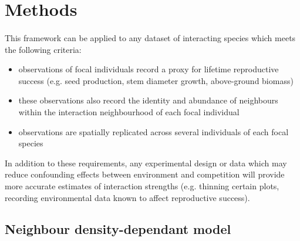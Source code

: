 \documentclass[a4,12pt]{article}
\begin{document}



    
\section{Methods}
    
    \paragraph{}
    This framework can be applied to any dataset of interacting species which meets the following criteria: 
    \begin{itemize}
        \item observations of focal individuals record a proxy for lifetime reproductive success (e.g. seed production, stem diameter growth, above-ground biomass)
        \item these observations also record the identity and abundance of neighbours within the interaction neighbourhood of each focal individual
        \item observations are spatially replicated across several individuals of each focal species
    \end{itemize}
    In addition to these requirements, any experimental design or data which may reduce confounding effects between environment and competition will provide more accurate estimates of interaction strengths (e.g. thinning certain plots, recording environmental data known to affect reproductive success). 
    
    \subsection{Neighbour density-dependant model}
        
\end{document}
